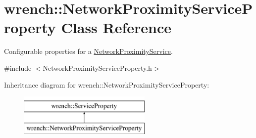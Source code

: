 \hypertarget{classwrench_1_1_network_proximity_service_property}{}\section{wrench\+:\+:Network\+Proximity\+Service\+Property Class Reference}
\label{classwrench_1_1_network_proximity_service_property}


Configurable properties for a \hyperlink{classwrench_1_1_network_proximity_service}{Network\+Proximity\+Service}.  




{\ttfamily \#include $<$Network\+Proximity\+Service\+Property.\+h$>$}

Inheritance diagram for wrench\+:\+:Network\+Proximity\+Service\+Property\+:\begin{figure}[H]
\begin{center}
\leavevmode
\includegraphics[height=2.000000cm]{classwrench_1_1_network_proximity_service_property}
\end{center}
\end{figure}
